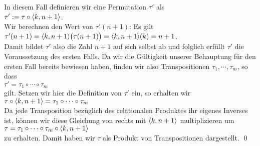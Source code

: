 \begin{enumerate}
\begin{enumerate}
                   In diesem Fall definieren wir eine Permutation $\tau'$ als
                   \\[0.2cm]
                   \hspace*{1.3cm}
                   $\tau' := \tau \circ \pair(k, n+1)$.
                   \\[0.2cm]
                   Wir berechnen den Wert von $\tau'(n+1)$:  Es gilt
                   \\[0.2cm]
                   \hspace*{1.3cm}
                   $\tau'(n+1) = \pair(k, n+1)\bigl(\tau(n+1)\bigr) = \pair(k, n+1)(k) = n+1$.
                   \\[0.2cm]
                   Damit bildet $\tau'$ also die Zahl $n+1$ auf sich selbst ab und folglich erf\"ullt
                   $\tau'$ die Voraussetzung des ersten Falls.  Da wir die G\"ultigkeit unserer Behauptung f\"ur
                   den ersten Fall bereits bewiesen haben, finden wir also Transpositionen 
                   $\tau_1, \cdots, \tau_m$, so dass
                   \\[0.2cm]
                   \hspace*{1.3cm}
                   $\tau' = \tau_1 \circ \cdots \circ \tau_m$
                   \\[0.2cm]
                   gilt.  Setzen wir hier die Definition von $\tau'$ ein, so erhalten wir
                   \\[0.2cm]
                   \hspace*{1.3cm}
                   $\tau \circ \pair(k, n+1) =  \tau_1 \circ \cdots \circ \tau_m$
                   \\[0.2cm]
                   Da jede Transposition bez\"uglich des relationalen Produktes ihr eigenes Inverses
                   ist, k\"onnen wir diese Gleichung von rechts mit $\pair(k, n+1)$ multiplizieren um
                   \\[0.2cm]
                   \hspace*{1.3cm}
                   $\tau =  \tau_1 \circ \cdots \circ \tau_m \circ \pair(k, n+1)$
                   \\[0.2cm]
                   zu erhalten.  Damit haben wir $\tau$ als Produkt von Transpositionen dargestellt.
                   \qed
             \end{enumerate}
             \renewcommand{\labelenumi}{(\alph{enumii})}
\end{enumerate}
\pagebreak

